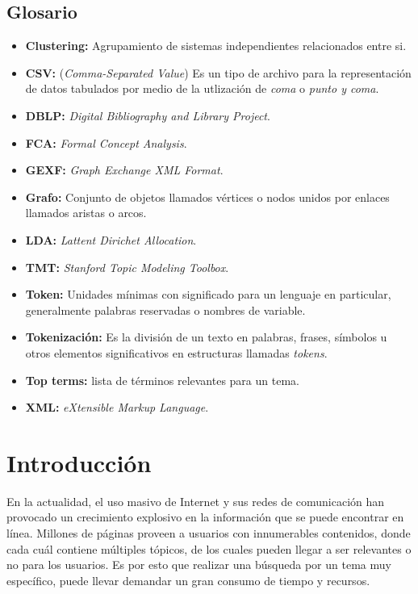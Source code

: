 \documentclass[12pt,oneside,letterpaper]{book}
\newcommand{\gli}[2]{\item{\textbf{#1:} #2}} %
\newcommand{\eng}[1]{\textit{#1}\xspace}			%
\theoremstyle{definition}
\begin{document}
\section*{Glosario}
\thispagestyle{empty}
\begin{itemize}
	\gli{Clustering}{Agrupamiento de sistemas independientes relacionados entre si.}
	\gli{CSV}{(\eng{Comma-Separated Value}) Es un tipo de archivo para la representación de datos tabulados por medio de la utlización de \eng{coma} o \eng{punto y coma}.}
	\gli{DBLP}{\eng{Digital Bibliography and Library Project}.}
	\gli{FCA}{\eng{Formal Concept Analysis}.}
	\gli{GEXF}{\eng{Graph Exchange XML Format}.}
	\gli{Grafo}{Conjunto de objetos llamados vértices o nodos unidos por enlaces llamados aristas o arcos.}
	\gli{LDA}{\eng{Lattent Dirichet Allocation}.}
	\gli{TMT}{\eng{Stanford Topic Modeling Toolbox}.}
	\gli{Token}{Unidades mínimas con significado para un lenguaje en particular, generalmente palabras reservadas o nombres de variable.}
	\gli{Tokenización}{Es la división de un texto en palabras, frases, símbolos u otros elementos significativos en estructuras llamadas \eng{tokens}.}
	\gli{Top terms}{lista de términos relevantes para un tema.}
	\gli{XML}{\eng{eXtensible Markup Language}.}
\end{itemize}
\clearpage


\tableofcontents
\clearpage


\endgroup
\setcounter{page}{1}
\chapter{Introducción}
En la actualidad, el uso masivo de Internet y sus redes de comunicación han provocado un crecimiento explosivo en la información que se puede encontrar en línea. Millones de páginas proveen a usuarios con innumerables contenidos, donde cada cuál contiene múltiples tópicos, de los cuales pueden llegar a ser relevantes o no para los usuarios. Es por esto que realizar una búsqueda por un tema muy específico, puede llevar demandar un gran consumo de tiempo y recursos.
\end{document}
